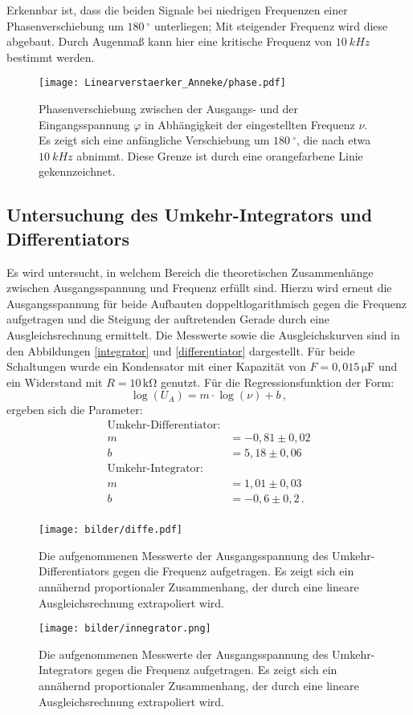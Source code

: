 Erkennbar ist, dass die beiden Signale bei niedrigen Frequenzen einer Phasenverschiebung um $\SI{180}{^\circ}$ unterliegen; Mit steigender Frequenz wird diese abgebaut.
Durch Augenmaß kann hier eine kritische Frequenz von $\SI{10}{kHz}$ bestimmt werden.
\begin{figure}[h]
  \centering
  \texttt{[image: Linearverstaerker\_Anneke/phase.pdf]}
  \caption{Phasenverschiebung zwischen der Ausgangs- und der Eingangsspannung $\varphi$ in Abhängigkeit der eingestellten Frequenz $\nu$. Es zeigt sich eine anfängliche Verschiebung um $\SI{180}{^\circ}$, die nach etwa $\SI{10}{kHz}$ abnimmt. Diese Grenze ist durch eine orangefarbene Linie gekennzeichnet.}
  \label{phase}
\end{figure}

\subsection{Untersuchung des Umkehr-Integrators und Differentiators}
Es wird untersucht, in welchem Bereich die theoretischen Zusammenhänge zwischen Ausgangsspannung und Frequenz erfüllt sind. Hierzu wird erneut die Ausgangsspannung für beide Aufbauten doppeltlogarithmisch gegen die Frequenz aufgetragen und die Steigung der auftretenden Gerade durch eine Ausgleichsrechnung ermittelt. Die Messwerte sowie die Ausgleichskurven sind in den Abbildungen \ref{integrator} und \ref{differentiator} dargestellt. Für beide Schaltungen wurde ein Kondensator mit einer Kapazität von $F=0{,}015\,\si{\micro\farad}$ und ein Widerstand mit $R=10\,\si{\kilo\ohm}$ genutzt. Für die Regressionsfunktion der Form:
\begin{equation}
\log(U_A)=m\cdot\log(\nu)+b\,,
\end{equation}
ergeben sich die Parameter:
\begin{align}
\text{Umkehr-Differentiator:}\nonumber\\
m&=-0{,}81\pm0{,}02\nonumber\\
b&=5{,}18\pm0{,}06\nonumber\\
\text{Umkehr-Integrator:}\nonumber\\
m&=1{,}01\pm0{,}03\nonumber\\
b&=-0{,}6\pm0{,}2\nonumber\,.\\
\end{align}

\begin{figure}[h]
  \centering
  \texttt{[image: bilder/diffe.pdf]}
  \caption{Die aufgenommenen Messwerte der Ausgangsspannung des Umkehr-Differentiators gegen die Frequenz aufgetragen. Es zeigt sich ein annähernd proportionaler Zusammenhang, der durch eine lineare Ausgleichsrechnung extrapoliert wird.}
\end{figure}
\begin{figure}[h]
  \centering
  \texttt{[image: bilder/innegrator.png]}
  \caption{Die aufgenommenen Messwerte der Ausgangsspannung des Umkehr-Integrators gegen die Frequenz aufgetragen. Es zeigt sich ein annähernd proportionaler Zusammenhang, der durch eine lineare Ausgleichsrechnung extrapoliert wird.}
\end{figure}


